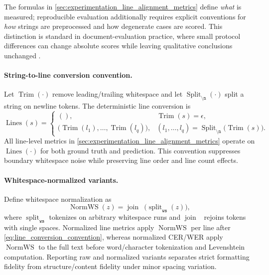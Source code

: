 The formulas in \autoref{sec:experimentation_line_alignment_metrics} define \emph{what} is measured; reproducible evaluation additionally requires explicit conventions for \emph{how} strings are preprocessed and how degenerate cases are scored. This distinction is standard in document-evaluation practice, where small protocol differences can change absolute scores while leaving qualitative conclusions unchanged .

\paragraph{String-to-line conversion convention.}
Let $\operatorname{Trim}(\cdot)$ remove leading/trailing whitespace and let $\operatorname{Split}_{\texttt{\textbackslash n}}(\cdot)$ split a string on newline tokens. The deterministic line conversion is
\begin{equation}
\operatorname{Lines}(s)=
\begin{cases}
(), & \operatorname{Trim}(s)=\epsilon,\\
\big(\operatorname{Trim}(l_1),\dots,\operatorname{Trim}(l_q)\big), &
(l_1,\dots,l_q)=\operatorname{Split}_{\texttt{\textbackslash n}}\!\big(\operatorname{Trim}(s)\big).
\end{cases}
\label{eq:line_conversion_convention}
\end{equation}
All line-level metrics in \autoref{sec:experimentation_line_alignment_metrics} operate on $\operatorname{Lines}(\cdot)$ for both ground truth and prediction. This convention suppresses boundary whitespace noise while preserving line order and line count effects.

\paragraph{Whitespace-normalized variants.}
Define whitespace normalization as
\begin{equation}
\operatorname{NormWS}(z)=\operatorname{join}_{\texttt{ }}\!\big(\operatorname{split}_{\texttt{ws}}(z)\big),
\label{eq:ws_normalization_operator}
\end{equation}
where $\operatorname{split}_{\texttt{ws}}$ tokenizes on arbitrary whitespace runs and $\operatorname{join}_{\texttt{ }}$ rejoins tokens with single spaces. Normalized line metrics apply $\operatorname{NormWS}$ per line after \autoref{eq:line_conversion_convention}, whereas normalized CER/WER apply $\operatorname{NormWS}$ to the full text before word/character tokenization and Levenshtein computation. Reporting raw and normalized variants separates strict formatting fidelity from structure/content fidelity under minor spacing variation.

